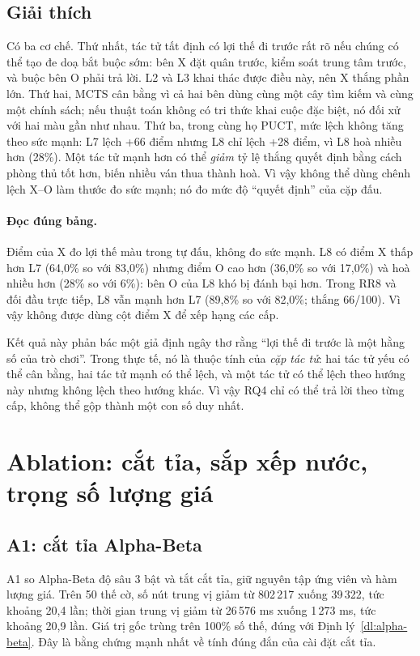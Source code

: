 \subsection{Giải thích}
Có ba cơ chế. Thứ nhất, tác tử tất định có lợi thế đi trước rất rõ nếu chúng có thể tạo đe doạ
bắt buộc sớm: bên X đặt quân trước, kiểm soát trung tâm trước, và buộc bên O phải trả lời. L2
và L3 khai thác được điều này, nên X thắng phần lớn. Thứ hai, MCTS cân bằng vì cả hai bên dùng
cùng một cây tìm kiếm và cùng một chính sách; nếu thuật toán không có tri thức khai cuộc đặc
biệt, nó đối xử với hai màu gần như nhau. Thứ ba, trong cùng họ PUCT, mức lệch không tăng theo sức mạnh: L7 lệch +66 điểm nhưng L8 chỉ
lệch +28 điểm, vì L8 hoà nhiều hơn (28\%). Một tác tử mạnh hơn có thể \emph{giảm} tỷ lệ thắng
quyết định bằng cách phòng thủ tốt hơn, biến nhiều ván thua thành hoà. Vì vậy không thể dùng
chênh lệch X--O làm thước đo sức mạnh; nó đo mức độ ``quyết định'' của cặp đấu.

\paragraph{Đọc đúng bảng.} Điểm của X đo lợi thế màu trong tự đấu, không đo sức mạnh. L8 có
điểm X thấp hơn L7 (64,0\% so với 83,0\%) nhưng điểm O cao hơn (36,0\% so với 17,0\%) và hoà
nhiều hơn (28\% so với 6\%): bên O của L8 khó bị đánh bại hơn. Trong RR8 và đối đầu trực tiếp,
L8 vẫn mạnh hơn L7 (89,8\% so với 82,0\%; thắng 66/100). Vì vậy không được dùng cột điểm X để
xếp hạng các cấp.

Kết quả này phản bác một giả định ngây thơ rằng ``lợi thế đi trước là một hằng số của trò
chơi''. Trong thực tế, nó là thuộc tính của \emph{cặp tác tử}: hai tác tử yếu có thể cân bằng,
hai tác tử mạnh có thể lệch, và một tác tử có thể lệch theo hướng này nhưng không lệch theo
hướng khác. Vì vậy RQ4 chỉ có thể trả lời theo từng cấp, không thể gộp thành một con số duy
nhất.

\section{Ablation: cắt tỉa, sắp xếp nước, trọng số lượng giá}
\label{sec:tn-ablation}
\subsection{A1: cắt tỉa Alpha-Beta}
\begin{table}[H]
  \centering\small
  \caption{Benchmark A1/A2/A7: số nút và thời gian trung vị trên tập thế cờ cố định.}
  \label{tab:tn-benchmark}
  
\end{table}
A1 so Alpha-Beta độ sâu 3 bật và tắt cắt tỉa, giữ nguyên tập ứng viên và hàm lượng giá. Trên 50
thế cờ, số nút trung vị giảm từ 802\,217 xuống 39\,322, tức khoảng 20,4 lần; thời gian trung vị
giảm từ 26\,576 ms xuống 1\,273 ms, tức khoảng 20,9 lần. Giá trị gốc trùng trên 100\% số thế,
đúng với Định lý~\ref{dl:alpha-beta}. Đây là bằng chứng mạnh nhất về tính đúng đắn của cài đặt
cắt tỉa.

